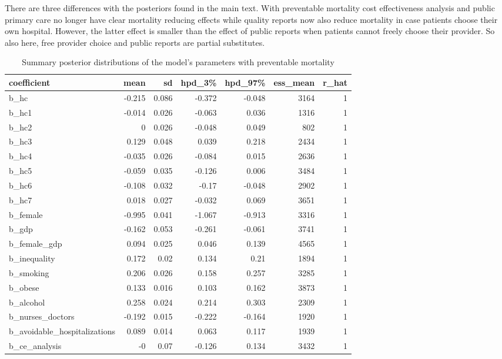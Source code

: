 \documentclass[12pt,english,a4paper]{article}
\begin{document}
There are three differences with the posteriors found in the main text. With preventable mortality cost effectiveness analysis and public primary care no longer have clear mortality reducing effects while quality reports now also reduce mortality in case patients choose their own hospital. However, the latter effect is smaller than the effect of public reports when patients cannot freely choose their provider. So also here, free provider choice and public reports are partial substitutes.

\begin{table}[htbp]
\caption{\label{tab:orgd5ee14d}Summary posterior distributions of the model's parameters with preventable mortality}
\centering
\begin{tabular}{lrrrrrr}
coefficient & mean & sd & hpd\_3\% & hpd\_97\% & ess\_mean & r\_hat\\
\hline
b\_hc & -0.215 & 0.086 & -0.372 & -0.048 & 3164 & 1\\
b\_hc1 & -0.014 & 0.026 & -0.063 & 0.036 & 1316 & 1\\
b\_hc2 & 0 & 0.026 & -0.048 & 0.049 & 802 & 1\\
b\_hc3 & 0.129 & 0.048 & 0.039 & 0.218 & 2434 & 1\\
b\_hc4 & -0.035 & 0.026 & -0.084 & 0.015 & 2636 & 1\\
b\_hc5 & -0.059 & 0.035 & -0.126 & 0.006 & 3484 & 1\\
b\_hc6 & -0.108 & 0.032 & -0.17 & -0.048 & 2902 & 1\\
b\_hc7 & 0.018 & 0.027 & -0.032 & 0.069 & 3651 & 1\\
b\_female & -0.995 & 0.041 & -1.067 & -0.913 & 3316 & 1\\
b\_gdp & -0.162 & 0.053 & -0.261 & -0.061 & 3741 & 1\\
b\_female\_gdp & 0.094 & 0.025 & 0.046 & 0.139 & 4565 & 1\\
b\_inequality & 0.172 & 0.02 & 0.134 & 0.21 & 1894 & 1\\
b\_smoking & 0.206 & 0.026 & 0.158 & 0.257 & 3285 & 1\\
b\_obese & 0.133 & 0.016 & 0.103 & 0.162 & 3873 & 1\\
b\_alcohol & 0.258 & 0.024 & 0.214 & 0.303 & 2309 & 1\\
b\_nurses\_doctors & -0.192 & 0.015 & -0.222 & -0.164 & 1920 & 1\\
b\_avoidable\_hospitalizations & 0.089 & 0.014 & 0.063 & 0.117 & 1939 & 1\\
b\_ce\_analysis & -0 & 0.07 & -0.126 & 0.134 & 3432 & 1\\

\end{tabular}
\end{table}
\end{document}
